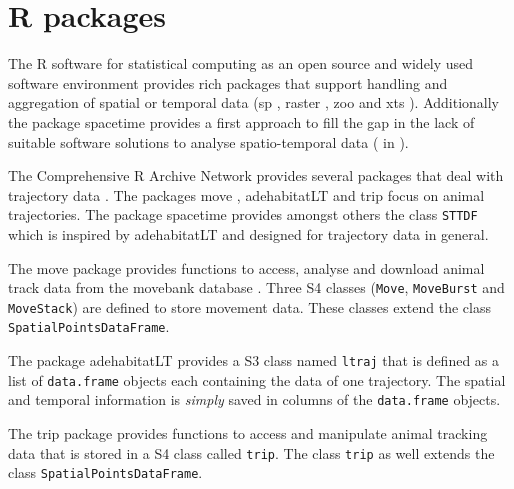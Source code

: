 \documentclass[12pt, oneside, a4paper]{scrbook}
\newcommand{\pkg}[1]{{\normalfont\fontseries{b}\selectfont #1}}
\let\proglang=\textsf
\let\code=\texttt
\begin{document}
\section{\proglang{R} packages}

The \proglang{R} software for statistical computing \citep{r_development_core_team_r:_2014} as an open source and widely used software environment provides rich packages that support handling and aggregation of spatial or temporal data (\pkg{sp} \citep{pebesma_sp:_2014}, \pkg{raster} \citep{hijmans_raster:_2014}, \pkg{zoo} \citep{zeileis_zoo:_2014} and \pkg{xts} \citep{ryan_xts:_2014}).
Additionally the package \pkg{spacetime} \citep{pebesma_spacetime:_2012} provides a first approach to fill the gap in the lack of suitable software solutions to analyse spatio-temporal data (\citet{schabenberger_statistical_2004} in \citet{pebesma_spacetime:_2012}). 
\par\medskip

The Comprehensive \proglang{R} Archive Network provides several packages that deal with trajectory data \citep{pebesma_cran_2014}. The packages \pkg{move} \citep{kranstauber_move:_2014}, \pkg{adehabitatLT} \citep{calenge_adehabitatlt:_2014} and \pkg{trip} \citep{sumner_trip:_2013} focus on animal trajectories. The package \pkg{spacetime} provides amongst others the class \code{STTDF} which is inspired by \pkg{adehabitatLT} \citep{bivand_applied_2008} and designed for trajectory data in general.
\par\medskip

The \pkg{move} package provides functions to access, analyse and download animal track data from the movebank database \citep{wikelski_movebank:_2011}. Three S4 classes (\code{Move}, \code{MoveBurst} and \code{MoveStack}) are defined to store movement data. These classes extend the class \code{SpatialPointsDataFrame}. 
\par\medskip

The package \pkg{adehabitatLT} provides a S3 class named \code{ltraj} that is defined as a list of \code{data.frame} objects each containing the data of one trajectory. The spatial and temporal information is \textit{simply} saved in columns of the \code{data.frame} objects.
\par\medskip

The \pkg{trip} package provides functions to access and manipulate animal tracking data that is stored in a S4 class called \code{trip}. The class \code{trip} as well extends the class \code{SpatialPointsDataFrame}.
\par\medskip
\end{document}
